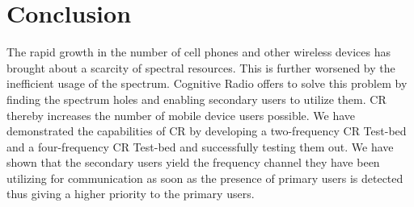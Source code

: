 \chapter{Conclusion}

The rapid growth in the number of cell phones and other wireless devices has 
brought about a scarcity of spectral resources. This is further worsened by the
inefficient usage of the spectrum. Cognitive Radio offers to solve this problem
by finding the spectrum holes and enabling secondary users to utilize them. CR 
thereby increases the number of mobile device users possible. We have 
demonstrated the capabilities of CR by developing a two-frequency CR Test-bed and
a four-frequency CR Test-bed and successfully testing them out.  We have shown
that the secondary users yield the frequency channel they have been utilizing
for communication as soon as the presence of primary users is detected thus
giving a higher priority to the primary users.
